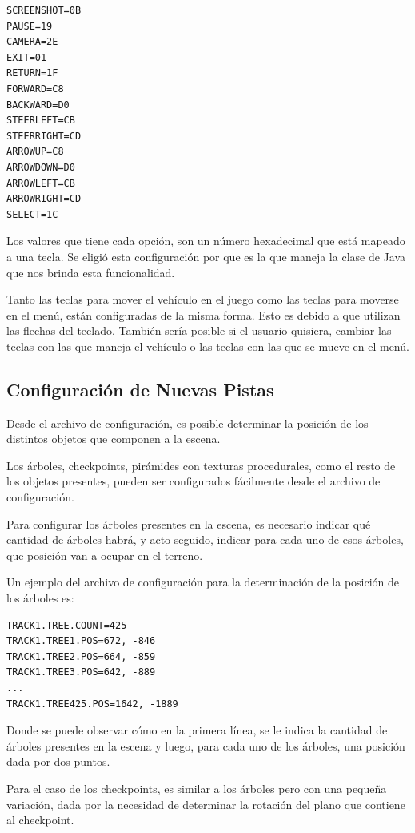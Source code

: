 \documentclass[a4paper,10pt]{article}
\begin{document}
\begin{verbatim}
SCREENSHOT=0B
PAUSE=19
CAMERA=2E
EXIT=01
RETURN=1F
FORWARD=C8
BACKWARD=D0
STEERLEFT=CB
STEERRIGHT=CD
ARROWUP=C8
ARROWDOWN=D0
ARROWLEFT=CB
ARROWRIGHT=CD
SELECT=1C
\end{verbatim}

Los valores que tiene cada opci\'on, son un n\'umero hexadecimal que est\'a
mapeado a una tecla.  Se eligi\'o esta configuraci\'on por que es la que maneja
la clase de Java que nos brinda esta funcionalidad.

Tanto las teclas para mover el veh\'iculo en el juego como las teclas para
moverse en el men\'u, est\'an configuradas de la misma forma.  Esto es debido a
que utilizan las flechas del teclado.  Tambi\'en ser\'ia posible si el usuario
quisiera, cambiar las teclas con las que maneja el veh\'iculo o las teclas con
las que se mueve en el men\'u.


\subsection{Configuraci\'on de Nuevas Pistas}

Desde el archivo de configuraci\'on, es posible determinar la posici\'on de los
distintos objetos que componen a la escena.

Los \'arboles, checkpoints, pir\'amides con texturas procedurales, como el resto
de
los objetos presentes, pueden ser configurados f\'acilmente desde el archivo de
configuraci\'on.

Para configurar los \'arboles presentes en la escena, es necesario indicar qu\'e
cantidad de \'arboles habr\'a, y acto seguido, indicar para cada uno de esos
\'arboles, que posici\'on van a ocupar en el terreno.

Un ejemplo del archivo de configuraci\'on para la determinaci\'on de la
posici\'on
de
los \'arboles es:

\begin{verbatim}
TRACK1.TREE.COUNT=425
TRACK1.TREE1.POS=672, -846
TRACK1.TREE2.POS=664, -859
TRACK1.TREE3.POS=642, -889
...
TRACK1.TREE425.POS=1642, -1889
\end{verbatim}

Donde se puede observar c\'omo en la primera l\'inea, se le indica la cantidad
de
\'arboles presentes en la escena y luego, para cada uno de los \'arboles, una
posici\'on dada por dos puntos.

Para el caso de los checkpoints, es similar a los \'arboles pero con una
peque\~na
variaci\'on, dada por la necesidad de determinar la rotaci\'on del plano que
contiene al checkpoint.
\end{document}
